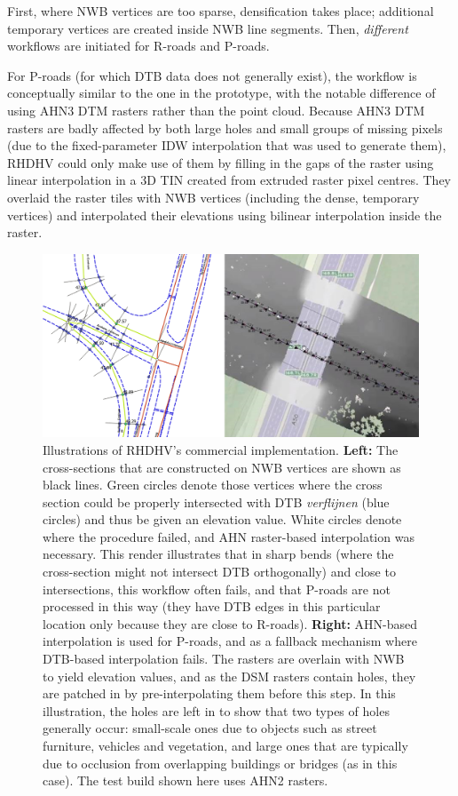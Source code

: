 First, where NWB vertices are too sparse, densification takes place; additional temporary vertices are created inside NWB line segments. Then, \textit{different} workflows are initiated for R-roads and P-roads.

For P-roads (for which DTB data does not generally exist), the workflow is conceptually similar to the one in the prototype, with the notable difference of using AHN3 DTM rasters rather than the point cloud. Because AHN3 DTM rasters are badly affected by both large holes and small groups of missing pixels (due to the fixed-parameter IDW interpolation that was used to generate them), RHDHV could only make use of them by filling in the gaps of the raster using linear interpolation in a 3D TIN created from extruded raster pixel centres. They overlaid the raster tiles with NWB vertices (including the dense, temporary vertices) and interpolated their elevations using bilinear interpolation inside the raster.

\begin{figure}[]
    \centering
    \includegraphics[width=\linewidth]{p2/figs/rhdhv_combined.png}
    \caption{Illustrations of RHDHV's commercial implementation. \textbf{Left:} The cross-sections that are constructed on NWB vertices are shown as black lines. Green circles denote those vertices where the cross section could be properly intersected with DTB \textit{verflijnen} (blue circles) and thus be given an elevation value. White circles denote where the procedure failed, and AHN raster-based interpolation was necessary. This render illustrates that in sharp bends (where the cross-section might not intersect DTB orthogonally) and close to intersections, this workflow often fails, and that P-roads are not processed in this way (they have DTB edges in this particular location only because they are close to R-roads). \textbf{Right:} AHN-based interpolation is used for P-roads, and as a fallback mechanism where DTB-based interpolation fails. The rasters are overlain with NWB to yield elevation values, and as the DSM rasters contain holes, they are patched in by pre-interpolating them before this step. In this illustration, the holes are left in to show that two types of holes generally occur: small-scale ones due to objects such as street furniture, vehicles and vegetation, and large ones that are typically due to occlusion from overlapping buildings or bridges (as in this case). The test build shown here uses AHN2 rasters.}
    \label{fig:rhdhv}
\end{figure}

